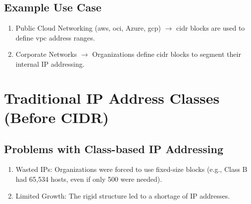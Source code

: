 \documentclass[../main.tex]{subfiles}
\begin{document}
\subsection{Example Use Case}
\begin{enumerate}
  \item Public Cloud Networking (\acrfull{aws}, \acrfull{oci}, Azure, \acrfull{gcp}) $\rightarrow$ \acrshort{cidr} blocks are used to define \acrfull{vpc} address ranges.
  \item Corporate Networks $\rightarrow$ Organizations define \acrshort{cidr} blocks to segment their internal IP addressing.
\end{enumerate}

\section{Traditional IP Address Classes (Before CIDR)}
\begin{center}
\end{center}


\subsection{Problems with Class-based IP Addressing}
\begin{enumerate}
  \item Wasted IPs: Organizations were forced to use fixed-size blocks (e.g., Class B had 65,534 hosts, even if only 500 were needed).
  \item Limited Growth: The rigid structure led to a shortage of IP addresses.
\end{enumerate}
\end{document}
